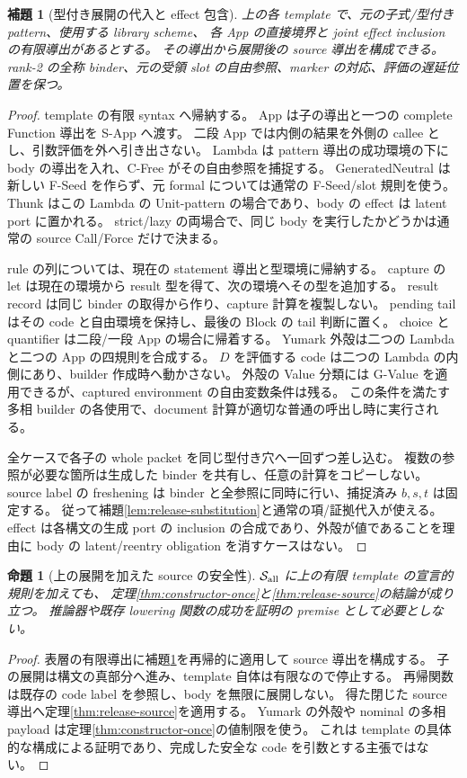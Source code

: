 \documentclass[11pt,a4paper]{article}
\newtheorem{lemma}[definition]{補題}
\newtheorem{proposition}[definition]{命題}
\newcommand{\Src}{\mathcal S}
\begin{document}
\begin{lemma}[型付き展開の代入と effect 包含]
\label{lem:surface-plug}
上の各 template で、元の子式/型付き pattern、使用する library scheme、
各 App の直接境界と joint effect inclusion の有限導出があるとする。
その導出から展開後の source 導出を構成できる。
rank-2 の全称 binder、元の受領 slot の自由参照、marker の対応、評価の遅延位置を保つ。
\end{lemma}
\begin{proof}
template の有限 syntax へ帰納する。
App は子の導出と一つの complete Function 導出を S-App へ渡す。
二段 App では内側の結果を外側の callee とし、引数評価を外へ引き出さない。
Lambda は pattern 導出の成功環境の下に body の導出を入れ、C-Free がその自由参照を捕捉する。
GeneratedNeutral は新しい F-Seed を作らず、元 formal については通常の F-Seed/slot 規則を使う。
Thunk はこの Lambda の Unit-pattern の場合であり、body の effect は latent port に置かれる。
strict/lazy の両場合で、同じ body を実行したかどうかは通常の source Call/Force だけで決まる。

rule の列については、現在の statement 導出と型環境に帰納する。
capture の let は現在の環境から result 型を得て、次の環境へその型を追加する。
result record は同じ binder の取得から作り、capture 計算を複製しない。
pending tail はその code と自由環境を保持し、最後の Block の tail 判断に置く。
choice と quantifier は二段/一段 App の場合に帰着する。
Yumark 外殻は二つの Lambda と二つの App の四規則を合成する。
\(D\) を評価する code は二つの Lambda の内側にあり、builder 作成時へ動かさない。
外殻の Value 分類には G-Value を適用できるが、captured environment の自由変数条件は残る。
この条件を満たす多相 builder の各使用で、document 計算が適切な普通の呼出し時に実行される。

全ケースで各子の whole packet を同じ型付き穴へ一回ずつ差し込む。
複数の参照が必要な箇所は生成した binder を共有し、任意の計算をコピーしない。
source label の freshening は binder と全参照に同時に行い、捕捉済み \(b,s,t\) は固定する。
従って補題\ref{lem:release-substitution}と通常の項/証拠代入が使える。
effect は各構文の生成 port の inclusion の合成であり、外殻が値であることを理由に
body の latent/reentry obligation を消すケースはない。
\end{proof}

\begin{proposition}[上の展開を加えた source の安全性]
\label{prop:surface-safety}
\(\Src_{\rm all}\) に上の有限 template の宣言的規則を加えても、
定理\ref{thm:constructor-once}と\ref{thm:release-source}の結論が成り立つ。
推論器や既存 lowering 関数の成功を証明の premise として必要としない。
\end{proposition}
\begin{proof}
表層の有限導出に補題\ref{lem:surface-plug}を再帰的に適用して source 導出を構成する。
子の展開は構文の真部分へ進み、template 自体は有限なので停止する。
再帰関数は既存の code label を参照し、body を無限に展開しない。
得た閉じた source 導出へ定理\ref{thm:release-source}を適用する。
Yumark の外殻や nominal の多相 payload は定理\ref{thm:constructor-once}の値制限を使う。
これは template の具体的な構成による証明であり、完成した安全な code を引数とする主張ではない。
\end{proof}
\end{document}
